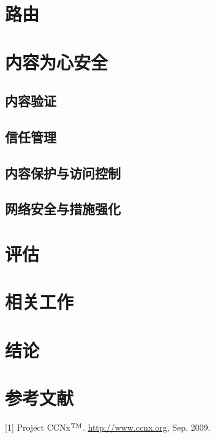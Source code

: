 \section{路由}
\label{sec:4}


\section{内容为心安全}
\label{sec:5}
	\subsection{内容验证}
	\label{sec:5.1}
	
	\subsection{信任管理}
	\label{sec:5.2}
	
	\subsection{内容保护与访问控制}
	\label{sec:5.3}
	
	\subsection{网络安全与措施强化}
	\label{sec:5.4}

\section{评估}
\label{sec:6}


\section{相关工作}
\label{sec:7}


\section{结论}
\label{sec:8}


\section{参考文献}
\def\tm{\leavevmode\hbox{$\rm {}^{TM}$}} %
[1] Project CCNx\tm. \url{http://www.ccnx.org}, Sep. 2009.

